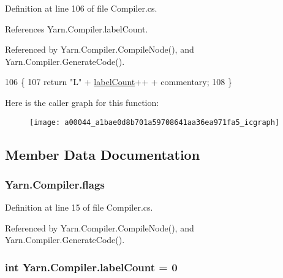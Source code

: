 Definition at line 106 of file Compiler.\-cs.



References Yarn.\-Compiler.\-label\-Count.



Referenced by Yarn.\-Compiler.\-Compile\-Node(), and Yarn.\-Compiler.\-Generate\-Code().


\begin{DoxyCode}
106                                                        \{
107             \textcolor{keywordflow}{return} \textcolor{stringliteral}{"L"} + \hyperlink{a00044_a87758397eba2e84cda8e0d6c40656f3f}{labelCount}++ + commentary;
108         \}
\end{DoxyCode}


Here is the caller graph for this function\-:
\nopagebreak
\begin{figure}[H]
\begin{center}
\leavevmode
\texttt{[image: a00044\_a1bae0d8b701a59708641aa36ea971fa5\_icgraph]}
\end{center}
\end{figure}




\subsection{Member Data Documentation}
\hypertarget{a00044_a541022d89bcf9bc8f794eb6d6b438d08}{
\subsubsection[{flags}]{ Yarn.\-Compiler.\-flags\hspace{0.3cm}{\ttfamily [private]}}}\label{a00044_a541022d89bcf9bc8f794eb6d6b438d08}


Definition at line 15 of file Compiler.\-cs.



Referenced by Yarn.\-Compiler.\-Compile\-Node(), and Yarn.\-Compiler.\-Generate\-Code().

\hypertarget{a00044_a87758397eba2e84cda8e0d6c40656f3f}{
\subsubsection[{label\-Count}]{\setlength{\rightskip}{0pt plus 5cm}int Yarn.\-Compiler.\-label\-Count = 0\hspace{0.3cm}{\ttfamily [private]}}}\label{a00044_a87758397eba2e84cda8e0d6c40656f3f}


